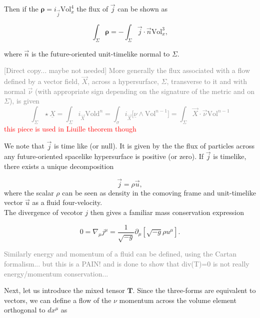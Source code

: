 \documentclass[11pt,a4paper,headinclude=true,DIV=14,BCOR=8mm,chapterprefix,listof=totoc,twoside,openright,abstracton]{scrbook}
\begin{document}
Then if the $\boldsymbol{\rho} = i_{\vec{j}}\text{Vol}_x ^4$ the flux of $\vec{j}$ can be shown as 

\begin{equation}
\int_{\Sigma} \boldsymbol{\rho} = - \int_{\Sigma}\vec{j}\cdot\vec{n}\text{Vol}_x ^3,
\end{equation}

where $\vec{n}$ is the future-oriented unit-timelike normal to $\Sigma$.


\textcolor{gray}{
[Direct copy... maybe not needed] More generally the flux associated with a flow defined by a vector field, $\vec{X}$, across a hypersurface, $\Sigma$, transverse to it and with normal $\vec{\nu}$ (with appropriate sign depending on the signature of the metric and on $\Sigma$), is given 
\begin{equation}
\int_{\Sigma} \star\underline{X} = \int_{\Sigma}i_{\vec{X}}\text{Vold}^n = \int_{\sigma}i_{\vec{X}}\big[\underline{\nu}\wedge\text{Vol}^{n-1}\big] = \int_{\Sigma}\vec{X}\cdot\vec{\nu}\text{Vol}^{n-1}
\label{eq:theory:flux_of_flow}
\end{equation}
}
\textcolor{red}{this piece is used in Liuille theorem though}

We note that $\vec{j}$ is time like (or null). It is given by the the flux of particles across any future-oriented spacelike hypersurface is positive (or zero). If $\vec{j}$ is timelike, there exists a unique decomposition 

\begin{equation}
\vec{j} = \rho \vec{u},
\label{eq:theory:defofjandu}
\end{equation}
where the scalar $\rho$ can be seen as density in the comoving frame and unit-timelike vector $\vec{u}$ as a fluid four-velocity.\\

The divergence of vecotor $j$ then gives a familiar mass conservation expression

\begin{equation}
0 = \nabla_{\mu}j^{\mu} = \frac{1}{\sqrt{-g}}\partial_{\mu}[\sqrt{-g}\rho u^{\mu}].
\label{eq:theory:nablamu_jmu}
\end{equation}

\textcolor{gray}{Similarly energy and momentum of a fluid can be defined, using the Cartan formalism... but this is a PAIN! and is done to show that div(T)=0 is not really energy/momentum conservation...}

Next, let us introduce the mixed tensor $\boldsymbol{T}$. Since the three-forms are equivalent to vectors, we can define a flow of the $\nu$ momentum across the volume element orthogonal to $dx^{\mu}$ as 
\end{document}
